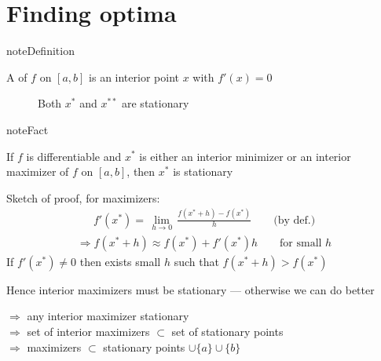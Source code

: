 \documentclass[letterpaper,10pt,english]{jupyterBook}
\begin{document}
\section{Finding optima}
\label{\detokenize{02.optimization_intro:finding-optima}}
\begin{sphinxadmonition}{note}{Definition}

\sphinxAtStartPar
A  of \(f\) on \([a, b]\) is an interior point \(x\) with \(f'(x) = 0\)
\end{sphinxadmonition}

\begin{figure}[htbp]
\centering
\capstart

\noindent{}
\caption{Both \(x^*\) and \(x^{**}\) are stationary}\label{\detokenize{02.optimization_intro:id4}}\end{figure}

\begin{sphinxadmonition}{note}{Fact}

\sphinxAtStartPar
If \(f\) is differentiable and \(x^*\) is either an interior minimizer
or an interior maximizer of \(f\) on \([a, b]\), then \(x^*\) is stationary
\end{sphinxadmonition}

\sphinxAtStartPar
Sketch of proof, for maximizers:
\begin{equation*}
\begin{split}
f'(x^*) = \, \lim_{h \to 0} \, \frac{f(x^* + h) - f(x^*)}{h}
\qquad \text{(by def.)}
\end{split}
\end{equation*}\begin{equation*}
\begin{split}
\Rightarrow f(x^* + h) \approx f(x^*) + f'(x^*) h 
\qquad \text{for small } h 
\end{split}
\end{equation*}
\sphinxAtStartPar
If \(f'(x^*) \ne 0\) then exists small \(h\) such that \(f(x^* + h) > f(x^*)\)

\sphinxAtStartPar
Hence interior maximizers must be stationary — otherwise we can do better

\sphinxAtStartPar
\(\Rightarrow\) any interior maximizer stationary\\
\(\Rightarrow\) set of interior maximizers \(\subset\) set of stationary points\\
\(\Rightarrow\) maximizers \(\subset\) stationary points \(\cup \{a\} \cup \{b\}\)
\end{document}
